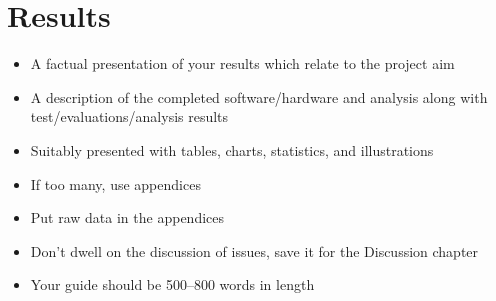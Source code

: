 \section{Results}
\begin{itemize}
\item A factual presentation of your results which relate to the project aim
\item A description of the completed software/hardware and analysis along with test/evaluations/analysis results
\item Suitably presented with tables, charts, statistics, and illustrations
\item If too many, use appendices
\item Put raw data in the appendices
\item Don't dwell on the discussion of issues, save it for the Discussion chapter
\item Your guide should be 500–800 words in length
\end{itemize}